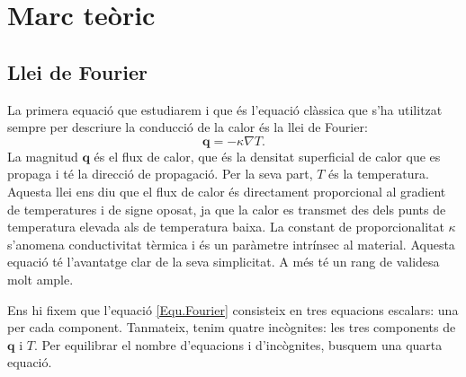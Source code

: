 \documentclass{article}
\begin{document}
\section{Marc te\`{o}ric}

\subsection{Llei de Fourier}

La primera equaci\'{o} que estudiarem i que \'{e}s l'equaci\'{o} cl\`{a}ssica que s'ha utilitzat sempre per descriure la conducci\'{o} de la calor \'{e}s la llei de Fourier:
\begin{equation}\label{Equ.Fourier}
\boldsymbol{q}=-\kappa\nabla T.
\end{equation}
La magnitud $\boldsymbol{q}$ \'{e}s el flux de calor, que \'{e}s la densitat superficial de calor que es propaga i t\'{e} la direcci\'{o} de propagaci\'{o}. Per la seva part, $T$ \'{e}s la temperatura. Aquesta llei ens diu que el flux de calor \'{e}s directament proporcional al gradient de temperatures i de signe oposat, ja que la calor es transmet des dels punts de temperatura elevada als de temperatura baixa. La constant de proporcionalitat $\kappa$ s'anomena conductivitat t\`{e}rmica i \'{e}s un par\`{a}metre intr\'{i}nsec al material. Aquesta equaci\'{o} t\'{e} l'avantatge clar de la seva simplicitat. A m\'{e}s t\'{e} un rang de validesa molt ample.

Ens hi fixem que l'equaci\'{o} \eqref{Equ.Fourier} consisteix en tres equacions escalars: una per cada component. Tanmateix, tenim quatre inc\`{o}gnites: les tres components de $\boldsymbol{q}$ i $T$. Per equilibrar el nombre d'equacions i d'inc\`{o}gnites, busquem una quarta equaci\'{o}.
\end{document}
